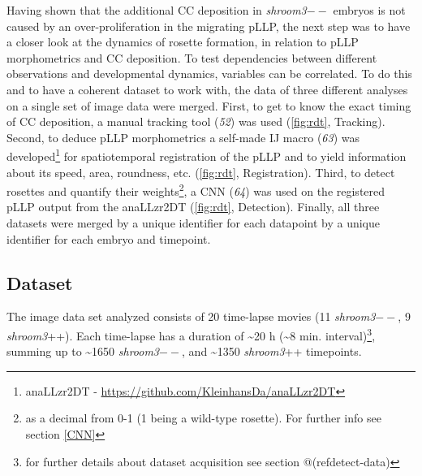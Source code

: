 \documentclass[11pt,singlespacinge,twoside]{reedthesis} %
\begin{document}
Having shown that the additional CC deposition in \emph{shroom3}\(--\) embryos is not caused by an over-proliferation in the migrating pLLP, the next step was to have a closer look at the dynamics of rosette formation, in relation to pLLP morphometrics and CC deposition. To test dependencies between different observations and developmental dynamics, variables can be correlated. To do this and to have a coherent dataset to work with, the data of three different analyses on a single set of image data were merged.
First, to get to know the exact timing of CC deposition, a manual tracking tool (\emph{52}) was used (\ref{fig:rdt}, Tracking). Second, to deduce pLLP morphometrics a self-made IJ macro (\emph{63}) was developed\footnote{anaLLzr2DT - \url{https://github.com/KleinhansDa/anaLLzr2DT}} for spatiotemporal registration of the pLLP and to yield information about its speed, area, roundness, etc. (\ref{fig:rdt}, Registration). Third, to detect rosettes and quantify their weights\footnote{as a decimal from 0-1 (1 being a wild-type rosette). For further info see section \ref{CNN}}, a CNN (\emph{64}) was used on the registered pLLP output from the anaLLzr2DT (\ref{fig:rdt}, Detection). Finally, all three datasets were merged by a unique identifier for each datapoint by a unique identifier for each embryo and timepoint.

\hypertarget{dataset-2}{%
\subsection{Dataset}\label{dataset-2}}

The image data set analyzed consists of 20 time-lapse movies (11 \emph{shroom3}\(--\), 9 \emph{shroom3}++). Each time-lapse has a duration of \textasciitilde{}20 h (\textasciitilde{}8 min. interval)\footnote{for further details about dataset acquisition see section @(refdetect-data)}, summing up to \textasciitilde{}1650 \emph{shroom3}\(--\), and \textasciitilde{}1350 \emph{shroom3}++ timepoints.
\end{document}
